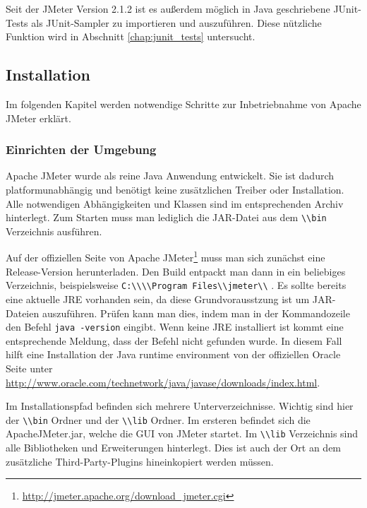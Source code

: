 \documentclass[a4paper,12pt]{article}
\newcommand{\codeInLine}[1]{%
\colorbox{graybackgroundColor}{\lstinline{#1}} %
}
\begin{document}
Seit der JMeter Version 2.1.2 ist es außerdem möglich in Java geschriebene JUnit-Tests als JUnit-Sampler zu importieren und auszuführen. Diese nützliche Funktion wird in Abschnitt \ref{chap:junit_tests} untersucht.

\subsection{Installation}
Im folgenden Kapitel werden notwendige Schritte zur Inbetriebnahme von Apache JMeter erklärt.

\subsubsection{Einrichten der Umgebung}
Apache JMeter wurde als reine Java Anwendung entwickelt. Sie ist dadurch platformunabhängig und benötigt keine zusätzlichen Treiber oder Installation. Alle notwendigen Abhängigkeiten und Klassen sind im entsprechenden Archiv hinterlegt. Zum Starten muss man lediglich die JAR-Datei aus dem \codeInLine{\\bin} Verzeichnis ausführen.

Auf der offiziellen Seite von Apache JMeter\footnote{\url{http://jmeter.apache.org/download_jmeter.cgi}} muss man sich zunächst eine Release-Version herunterladen. Den Build entpackt man dann in ein beliebiges Verzeichnis, beispielsweise \codeInLine{C:\\\\Program Files\\jmeter\\}.
Es sollte bereits eine aktuelle JRE vorhanden sein, da diese Grundvorausstzung ist um JAR-Dateien auszuführen. Prüfen kann man dies, indem man in der Kommandozeile den Befehl \codeInLine{java -version} eingibt. Wenn keine JRE installiert ist kommt eine entsprechende Meldung, dass der Befehl nicht gefunden wurde. In diesem Fall hilft eine Installation der Java runtime environment von der offiziellen Oracle Seite unter \url{http://www.oracle.com/technetwork/java/javase/downloads/index.html}.

Im Installationspfad befinden sich mehrere Unterverzeichnisse. Wichtig sind hier der \codeInLine{\\bin} Ordner und der \codeInLine{\\lib} Ordner. Im ersteren befindet sich die ApacheJMeter.jar, welche die GUI von JMeter startet. Im \codeInLine{\\lib} Verzeichnis sind alle Bibliotheken und Erweiterungen hinterlegt. Dies ist auch der Ort an dem zusätzliche Third-Party-Plugins hineinkopiert werden müssen.
\end{document}
